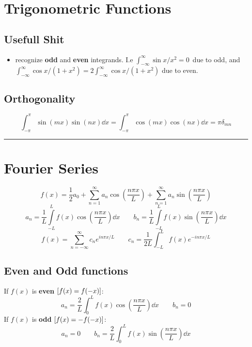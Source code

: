 \documentclass[10pt,a4paper]{article}
\renewcommand{\b}{\textbf}
\renewcommand{\exp}{e^}
\newcommand{\infint}{\int_{-\infty}^{\infty}}
\newcommand{\zeroinfint}{\int_{-\infty}^{\infty}}
\newcommand{\oneinfsum}{\sum_{n=1}^{\infty}}
\newcommand{\holine}{\rule{286pt}{1pt}}
\newcommand{\half}{\frac{1}{2}}
\begin{document}
\begin{multicols}{2}
\newpage

\section*{Trigonometric Functions}
\subsection*{Usefull Shit}
\begin{itemize}
    \item recognize \textbf{odd} and \textbf{even} integrands. I.e $\infint \sin{x}/x^2 = 0$ due to odd, and $\infint\cos{x}/(1+x^2) = 2\zeroinfint\cos{x}/(1+x^2)$ due to even.
\end{itemize}

\subsection*{Orthogonality}
\[
    \int_{-\pi}^\pi \sin(mx)\sin(nx) \dd{x} = \int_{-\pi}^\pi \cos(mx)\cos(nx) \dd{x} = \pi \delta_{mn}
\]


\holine
\section*{Fourier Series}
\[
    f(x) = \half a_0 + \oneinfsum a_n\cos(\frac{n\pi x}{L}) + \oneinfsum a_n\sin(\frac{n\pi x}{L})
\]
\[
    a_n = \frac{1}{L}\int\limits_{-L}^{L}f(x) \cos(\frac{n\pi x}{L}) \dd{x} \quad\quad
    b_n = \frac{1}{L}\int\limits_{-L}^{L}f(x) \sin(\frac{n\pi x}{L}) \dd{x}
\]
\[
    f(x) = \sum_{n=-\infty}^{\infty} c_n \exp{in\pi x/L}  \quad\quad
    c_n = \frac{1}{2L}\int_{-L}^L f(x) \exp{-in\pi x/L}
\]

\subsection*{Even and Odd functions}
If $f(x)$ is \b{even} $\qty[f(x) = f(-x)]$:
\[
    a_n = \frac{2}{L}\int_0^L f(x)\cos(\frac{n\pi x}{L}) \dd{x} \quad\quad b_n = 0
\]
If $f(x)$ is \b{odd} $\qty[f(x) = -f(-x)]$:
\[
    a_n = 0 \quad\quad b_n = \frac{2}{L}\int_0^L f(x)\sin(\frac{n\pi x}{L}) \dd{x}
\]



\end{multicols}
\end{document}
